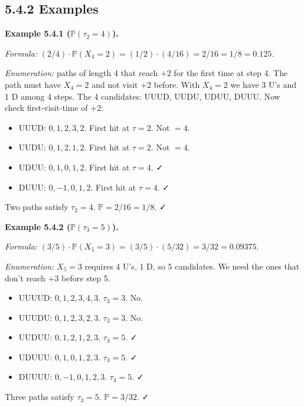 \documentclass[
  10pt,
  twoside]{book}
\providecommand{\tightlist}{%
  \setlength{\itemsep}{0pt}\setlength{\parskip}{0pt}}
\begin{document}
\subsection{5.4.2 Examples}\label{examples-25}

\textbf{Example 5.4.1 (\(\mathbb P(\tau_2 = 4)\)).}

\emph{Formula:}
\((2/4) \cdot \mathbb P(X_4 = 2) = (1/2) \cdot (4/16) = 2/16 = 1/8 = 0.125\).

\emph{Enumeration:} paths of length 4 that reach \(+2\) for the first
time at step 4. The path must have \(X_4 = 2\) and not visit \(+2\)
before. With \(X_4 = 2\) we have 3 U's and 1 D among 4 steps. The 4
candidates: UUUD, UUDU, UDUU, DUUU. Now check first-visit-time of
\(+2\):

\begin{itemize}
\tightlist
\item
  UUUD: \(0, 1, 2, 3, 2\). First hit at \(\tau = 2\). Not \(= 4\).
\item
  UUDU: \(0, 1, 2, 1, 2\). First hit at \(\tau = 2\). Not \(= 4\).
\item
  UDUU: \(0, 1, 0, 1, 2\). First hit at \(\tau = 4\). ✓
\item
  DUUU: \(0, -1, 0, 1, 2\). First hit at \(\tau = 4\). ✓
\end{itemize}

Two paths satisfy \(\tau_2 = 4\). \(\mathbb P = 2/16 = 1/8\). ✓

\textbf{Example 5.4.2 (\(\mathbb P(\tau_3 = 5)\)).}

\emph{Formula:}
\((3/5) \cdot \mathbb P(X_5 = 3) = (3/5) \cdot (5/32) = 3/32 = 0.09375\).

\emph{Enumeration:} \(X_5 = 3\) requires 4 U's, 1 D, so 5 candidates. We
need the ones that don't reach \(+3\) before step 5.

\begin{itemize}
\tightlist
\item
  UUUUD: \(0,1,2,3,4,3\). \(\tau_3 = 3\). No.
\item
  UUUDU: \(0,1,2,3,2,3\). \(\tau_3 = 3\). No.
\item
  UUDUU: \(0,1,2,1,2,3\). \(\tau_3 = 5\). ✓
\item
  UDUUU: \(0,1,0,1,2,3\). \(\tau_3 = 5\). ✓
\item
  DUUUU: \(0,-1,0,1,2,3\). \(\tau_3 = 5\). ✓
\end{itemize}

Three paths satisfy \(\tau_3 = 5\). \(\mathbb P = 3/32\). ✓
\end{document}
